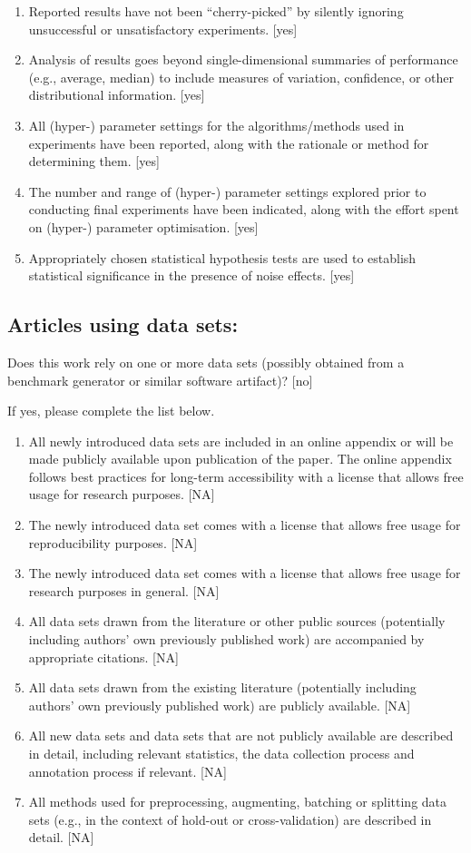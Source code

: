 \documentclass[manuscript, screen, review]{jair}
\begin{document}
\begin{enumerate}
    [yes]
    \item 
    Reported results have not been ``cherry-picked'' by silently ignoring unsuccessful or unsatisfactory experiments. 
    [yes]
    \item 
    Analysis of results goes beyond single-dimensional summaries of performance (e.g., average, median) to include measures of variation, confidence, or other distributional information. 
    [yes]
    \item 
    All (hyper-) parameter settings for 
    the algorithms/methods used in experiments have been reported, along with the rationale or method for determining them. 
    [yes]
    \item 
    The number and range of (hyper-) parameter settings explored prior to conducting final experiments have been indicated, along with the effort spent on (hyper-) parameter optimisation. 
    [yes]
    \item 
    Appropriately chosen statistical hypothesis tests are used to establish statistical significance
    in the presence of noise effects.
    [yes]
\end{enumerate}


\subsection*{Articles using data sets:}
Does this work rely on one or more data sets (possibly obtained from a benchmark generator or similar software artifact)? 
[no]

If yes, please complete the list below.
\begin{enumerate}
    \item 
    All newly introduced data sets 
    are included in an online appendix 
    or will be made publicly available upon publication of the paper.
    The online appendix follows best practices for long-term accessibility with a license
    that allows free usage for research purposes.
    [NA]
    \item The newly introduced data set comes with a license that
    allows free usage for reproducibility purposes.
    [NA]
    \item The newly introduced data set comes with a license that
    allows free usage for research purposes in general.
    [NA]
    \item All data sets drawn from the literature or other public sources (potentially including authors' own previously published work) are accompanied by appropriate citations.
    [NA]
    \item All data sets drawn from the existing literature (potentially including authors’ own previously published work) are publicly available. [NA]
    \item All new data sets and data sets that are not publicly available are described in detail, including relevant statistics, the data collection process and annotation process if relevant.
    [NA]
    \item 
    All methods used for preprocessing, augmenting, batching or splitting data sets (e.g., in the context of hold-out or cross-validation)
    are described in detail. [NA]
\end{enumerate}
\end{document}
